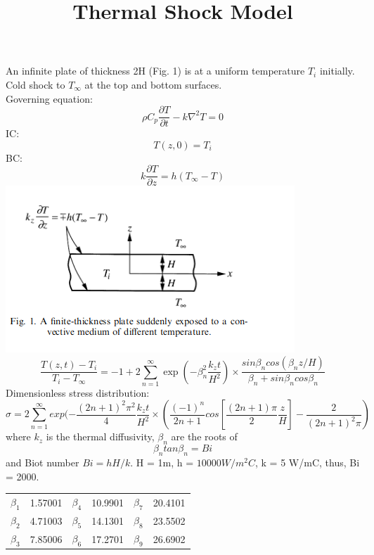 \documentclass[12pt]{article}
\begin{document}
 
\title{Thermal Shock Model }
\maketitle
An infinite plate \cite{thermalShock_solid} of thickness 2H (Fig. 1) is at a uniform temperature $T_i$ initially.  Cold shock to $T_{\infty}$ at the top and bottom surfaces.  \\

Governing equation: 
\[\rho C_p \frac{\partial T}{\partial t} - k \nabla^2 T = 0 \]
IC:
\[T(z,0) = T_i\]
BC:
\[k\frac{\partial T}{\partial z} = h(T_{\infty} - T) \]
\includegraphics[]{fig1.png}
\begin{equation} \label{T_FS}
\frac{T(z,t) - T_i}{T_i - T_{\infty}} = -1 + 2 \sum ^{\infty} _{n=1} \exp(-\beta_n^2 \frac{k_z t}{H^2}) \times \frac{sin \beta_n cos(\beta_nz/H)}{\beta_n + sin \beta_n cos \beta_n} 
\end{equation}
Dimensionless stress distribution:
\[\sigma = 2 \sum ^{\infty} _{n=1} exp ( -\frac{(2n+1)^2\pi^2}{4} \frac{k_z t}{H^2} \times \left(\frac{(-1)^n}{2n+1} cos [\frac{(2n+1)\pi}{2} \frac{z}{H}] - \frac{2}{(2n+1)^2 \pi}\right) \]
where $k_z$ is the thermal diffusivity, $\beta_n$ are the roots of \[\beta_n tan \beta_n = Bi\]
and Biot number $Bi = hH/k$.  
H = 1m, h = $10000 W/m^2C$, k = 5 W/mC, thus, Bi = 2000.


\begin{center}
\begin{tabular}{ |c|c||c|c||c|c|| } 
 \hline
 $\beta_1$ & 1.57001 & $\beta_4$ & 10.9901 & $\beta_7$ & 20.4101 \\ 
 $\beta_2$ & 4.71003 & $\beta_5$ & 14.1301 & $\beta_8$ &  23.5502 \\ 
 $\beta_3$ & 7.85006 & $\beta_6$ & 17.2701 & $\beta_9$ & 26.6902 \\ 
 \hline
\end{tabular}
\end{center}
\end{document}
